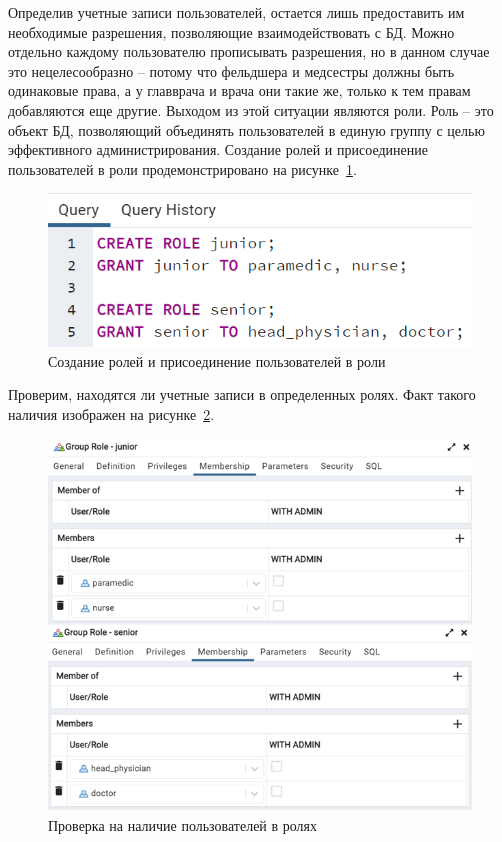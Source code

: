 Определив учетные записи пользователей, остается лишь предоставить им необходимые разрешения, позволяющие взаимодействовать с БД. Можно отдельно каждому пользователю прописывать разрешения, но в данном случае это нецелесообразно – потому что фельдшера и медсестры должны быть одинаковые права, а у главврача и врача они такие же, только к тем правам добавляются еще другие. Выходом из этой ситуации являются роли. Роль – это объект БД, позволяющий объединять пользователей в единую группу с целью эффективного администрирования. Создание ролей и присоединение пользователей в роли продемонстрировано на рисунке~\ref{fig:fig11}.

\begin{figure}
  \includegraphics[scale=1]{inc/roles}
  \caption{Создание ролей и присоединение пользователей в роли}
  \label{fig:fig11}
\end{figure}

Проверим, находятся ли учетные записи в определенных ролях. Факт такого наличия изображен на рисунке~\ref{fig:fig12}.

\begin{figure}
  \includegraphics[scale=1.5]{inc/check_roles}
  \caption{Проверка на наличие пользователей в ролях}
  \label{fig:fig12}
\end{figure}

